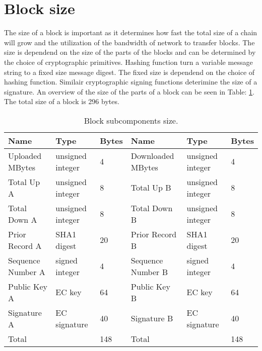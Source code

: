\section{Block size}
The size of a block is important as it determines how fast the total size of a chain will grow
and the utilization of the bandwidth of network to transfer blocks.
The size is dependend on the size of the parts of the blocks
and can be determined by the choice of cryptographic primitives.
Hashing function turn a variable message string to a fixed size message digest\cite{VanderLubbe-crypto}.
The fixed size is dependend on the choice of hashing function.
Similair cryptographic signing functions deterimine the size of a signature.
An overview of the size of the parts of a block can be seen in Table: \ref{table:block_size}.
The total size of a block is 296 bytes.

\begin{table}[]
\begin{adjustwidth}{-.5in}{-.5in}
\begin{center}
\begin{tabular}{lll||lll}
Name              & Type             & Bytes                   & Name              & Type             & Bytes \\ \hline
Uploaded MBytes   & unsigned integer & 4                       & Downloaded MBytes & unsigned integer & 4     \\
Total Up A        & unsigned integer & 8                       & Total Up B        & unsigned integer & 8     \\
Total Down A      & unsigned integer & 8                       & Total Down B      & unsigned integer & 8     \\
Prior Record A    & SHA1 digest      & 20                      & Prior Record B    & SHA1 digest      & 20    \\
Sequence Number A & signed integer   & 4                       & Sequence Number B & signed integer   & 4     \\
Public Key A      & EC key           & 64                      & Public Key B      & EC key           & 64    \\
Signature A       & EC signature     & 40                      & Signature B       & EC signature     & 40    \\ \hline
Total             &                  & 148                     & Total                  &                  & 148

\end{tabular}
\caption{Block subcomponents size.}
\label{table:block_size}
\end{center}
\end{adjustwidth}
\end{table}

